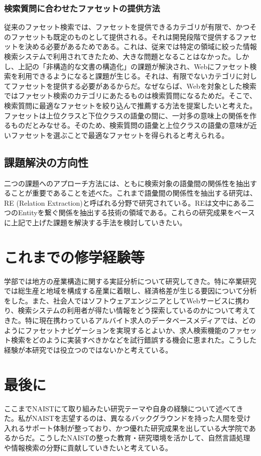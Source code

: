 \documentclass[a4j,10pt, twocolumn]{jarticle} \usepackage[dvipdfmx]{graphicx} \usepackage{amssymb} \usepackage{amsmath}
\begin{document}
\subsubsection{検索質問に合わせたファセットの提供方法}
従来のファセット検索では、ファセットを提供できるカテゴリが有限で、かつそのファセットも既定のものとして提供される。それは開発段階で提供するファセットを決める必要があるためである。これは、従来では特定の領域に絞った情報検索システムで利用されてきたため、大きな問題となることはなかった。しかし、上記の「非構造的な文書の構造化」の課題が解決され、Webにファセット検索を利用できるようになると課題が生じる。それは、有限でないカテゴリに対してファセットを提供する必要があるからだ。なぜならば、Webを対象とした検索ではファセット検索のカテゴリにあたるものは検索質問になるためだ。そこで、検索質問に最適なファセットを絞り込んで推薦する方法を提案したいと考えた。ファセットは上位クラスと下位クラスの語彙の間に、一対多の意味上の関係を作るものだとみなせる。そのため、検索質問の語彙と上位クラスの語彙の意味が近いファセットを選ぶことで最適なファセットを得られると考えられる。

\subsection{課題解決の方向性}
二つの課題へのアプローチ方法には、ともに検索対象の語彙間の関係性を抽出することが重要であることを述べた。これまで語彙間の関係性を抽出する研究は、RE (Relation Extraction)と呼ばれる分野で研究されている。REは文中にある二つのEntityを繋ぐ関係を抽出する技術の領域である。これらの研究成果をベースに上記で上げた課題を解決する手法を検討していきたい。

\section{これまでの修学経験等}
 学部では地方の産業構造に関する実証分析について研究してきた。特に卒業研究では総生産と地域を構成する産業に着眼し、経済格差が生じる要因について分析をした。また、社会人ではソフトウェアエンジニアとしてWebサービスに携わり、検索システムの利用者が得たい情報をどう探索しているのかについて考えてきた。特に現在携わっているアルバイト求人のデータベースメディアでは、どのようにファセットナビゲーションを実現するとよいか、求人検索機能のファセット検索をどのように実装すべきかなどを試行錯誤する機会に恵まれた。こうした経験が本研究では役立つのではないかと考えている。

\section{最後に}
ここまでNAISTにて取り組みたい研究テーマや自身の経験について述べてきた。私がNAISTを志望するのは、異なるバックグラウンドを持った人間を受け入れるサポート体制が整っており、かつ優れた研究成果を出している大学院であるからだ。こうしたNAISTの整った教育・研究環境を活かして、自然言語処理や情報検索の分野に貢献していきたいと考えている。
\end{document}
